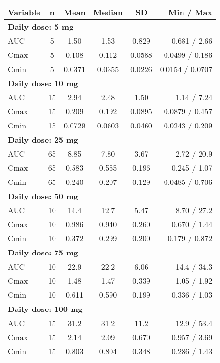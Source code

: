 \setlength{\tabcolsep}{5pt} 
\begin{threeparttable}
\renewcommand{\arraystretch}{1.1}
\begin{tabular}[h]{lccccr}
\hline
Variable & n & Mean & Median & SD & Min / Max \\
\hline
\multicolumn{6}{l}{\textbf{Daily dose: 5 mg}}\\%
AUC & 5 & 1.50 & 1.53 & 0.829 & 0.681 / 2.66 \\
Cmax & 5 & 0.108 & 0.112 & 0.0588 & 0.0499 / 0.186 \\
Cmin & 5 & 0.0371 & 0.0355 & 0.0226 & 0.0154 / 0.0707 \\
\hline \multicolumn{6}{l}{\textbf{Daily dose: 10 mg}}\\%
AUC & 15 & 2.94 & 2.48 & 1.50 & 1.14 / 7.24 \\
Cmax & 15 & 0.209 & 0.192 & 0.0895 & 0.0879 / 0.457 \\
Cmin & 15 & 0.0729 & 0.0603 & 0.0460 & 0.0243 / 0.209 \\
\hline \multicolumn{6}{l}{\textbf{Daily dose: 25 mg}}\\%
AUC & 65 & 8.85 & 7.80 & 3.67 & 2.72 / 20.9 \\
Cmax & 65 & 0.583 & 0.555 & 0.196 & 0.245 / 1.07 \\
Cmin & 65 & 0.240 & 0.207 & 0.129 & 0.0485 / 0.706 \\
\hline \multicolumn{6}{l}{\textbf{Daily dose: 50 mg}}\\%
AUC & 10 & 14.4 & 12.7 & 5.47 & 8.70 / 27.2 \\
Cmax & 10 & 0.986 & 0.940 & 0.260 & 0.670 / 1.44 \\
Cmin & 10 & 0.372 & 0.299 & 0.200 & 0.179 / 0.872 \\
\hline \multicolumn{6}{l}{\textbf{Daily dose: 75 mg}}\\%
AUC & 10 & 22.9 & 22.2 & 6.06 & 14.4 / 34.3 \\
Cmax & 10 & 1.48 & 1.47 & 0.339 & 1.05 / 1.92 \\
Cmin & 10 & 0.611 & 0.590 & 0.199 & 0.336 / 1.03 \\
\hline \multicolumn{6}{l}{\textbf{Daily dose: 100 mg}}\\%
AUC & 15 & 31.2 & 31.2 & 11.2 & 12.9 / 53.4 \\
Cmax & 15 & 2.14 & 2.09 & 0.670 & 0.957 / 3.69 \\
Cmin & 15 & 0.803 & 0.804 & 0.348 & 0.286 / 1.43 \\

\end{tabular}
\end{threeparttable}
